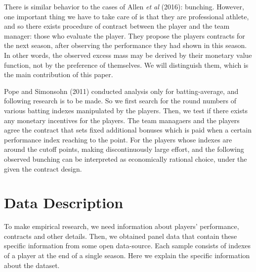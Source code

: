 \documentclass[dvipdfmx, 12pt]{article}
\begin{document}
There is similar behavior to the cases of  Allen \textit{et al} (2016): bunching. However, one important thing we have to take care of is that they are professional athlete, and so there exists procedure of contract between the player and the team manager: those who evaluate the player. They propose the players contracts for the next season, after observing the performance they had shown in this season. In other words, the observed excess mass may be derived by their monetary value function, not by the preference of themselves. We will distinguish them, which is the main contribution of this paper.

Pope and Simonsohn (2011) conducted analysis only for batting-average, and following research is to be made. So we first search for the round numbers of various batting indexes manipulated by the players. Then, we test if there exists any monetary incentives for the players. The team managaers and the players agree the contract that sets fixed additional bonuses which is paid when a certain performance index reaching to the point. For the players whose indexes are around the cutoff points, making discontinuously large effort, and the following observed bunching can be interpreted as economically rational choice, under the given the contract design.


\section{Data Description}

To make empirical research, we need information about players' performance, contracts and other details. Then, we obtained panel data that contain these specific information from some open data-source. Each sample consists of indexes of a player at the end of a single season. Here we explain the specific information about the dataset.
\end{document}
